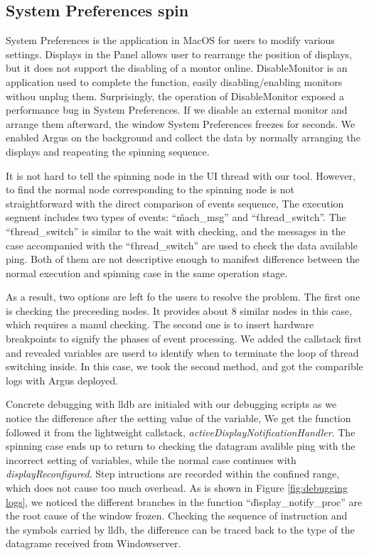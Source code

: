 \subsection{System Preferences spin}
System Preferences is the application in MacOS for users to modify various settings.                                        
Displays in the Panel allows user to rearrange the position of displays, but it does not support the disabling of a montor online.
DisableMonitor is an application used to complete the function, easily disabling/enabling  monitors withou unplug them.                                                                
Surprisingly, the operation of DisableMonitor exposed a performance bug in System Preferences.
If we disable an external monitor and arrange them afterward, the window System Preferences freezes for seconds.  
We enabled Argus on the background and collect the data by normally arranging the displays and reapeating the spinning sequence.

It is not hard to tell the spinning node in the UI thread with our tool.
However, to find the normal node corresponding to the spinning node is not straightforward with the direct comparison of events sequence,
The execution segment includes two types of events: ``\v{mach\_msg}'' and ``\v{thread\_switch}''.
The ``\v{thread\_switch}'' is similar to the wait with checking, 
and the messages in the case accompanied with the ``\v{thread\_switch}'' are used to check the data available ping.
Both of them are not descriptive enough to manifest difference between the normal execution and spinning case in the same operation stage.

As a result, two options are left fo the users to resolve the problem.
The first one is checking the preceeding nodes.
It provides about 8 similar nodes in this case, which requires a manul checking.
The second one is to insert hardware breakpoints to signify the phases of event processing.
We added the callstack first and revealed variables are userd to identify when to terminate the loop of thread switching inside.
In this case, we took the second method, and got the comparible logs with Argus deployed.

Concrete debugging with lldb are initialed with our debugging scripts as we notice the difference after the setting value of the variable,
We get the function followed it from the lightweight callstack, \textit{activeDisplayNotificationHandler}.
The spinning case ends up to return to checking the datagram avalible ping with the incorrect setting of variables,
while the normal case continues with \textit{displayReconfigured}.
Step intructions are recorded within the confined range, which does not cause too much overhead.
As is shown in Figure \ref{fig:debugging logs}, we noticed the different branches
in the function ``\v{display\_notify\_proc}'' are the root cause of the window frozen.
Checking the sequence of instruction and the symbols carried by lldb, 
the difference can be traced back to the type of the datagrame received from Windowserver.


